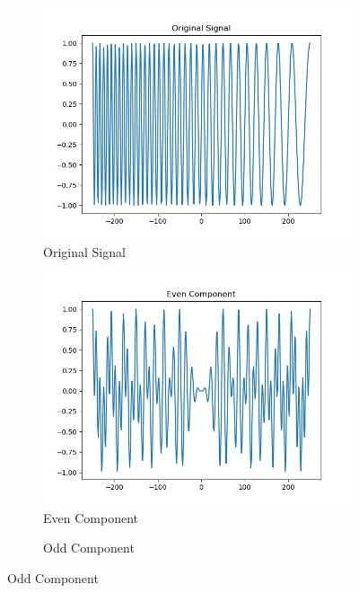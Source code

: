 \documentclass[10pt,a4paper, margin=1in]{article}
\begin{document}
\begin{enumerate}
\begin{enumerate}
\begin{figure}[H]
    \centering
    \begin{subfigure}[t]{0.3\linewidth}
        \centering
        \caption{Original Signal}
        \includegraphics[width=1\linewidth]{assets/q7a/chirp_part_a_original.png}
    \end{subfigure}
    \begin{subfigure}[t]{0.3\linewidth}
        \centering
        \caption{Even Component}
        \includegraphics[width=1\linewidth]{assets/q7a/chirp_part_a_even.png}
    \end{subfigure}
    \begin{subfigure}[t]{0.3\linewidth}
        \centering
        \caption{Odd Component}

\end{subfigure}
\end{figure}
\end{enumerate}
\end{enumerate}
\end{document}
